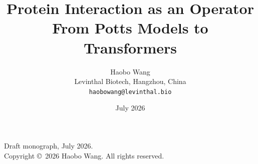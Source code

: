 \documentclass[11pt,openany]{book}
\title{Protein Interaction as an Operator\\
\large From Potts Models to Transformers}
\author{Haobo Wang\\
\small Levinthal Biotech, Hangzhou, China\\
\small\texttt{haobowang@levinthal.bio}}
\date{July 2026}
\theoremstyle{definition}
\theoremstyle{remark}
\begin{document}
\frontmatter
\maketitle

\thispagestyle{empty}
\vspace*{\fill}
\noindent
Draft monograph, July 2026.\\
Copyright \copyright\ 2026 Haobo Wang. All rights reserved.
\vspace*{\fill}
\clearpage



\tableofcontents

\mainmatter



\end{document}
